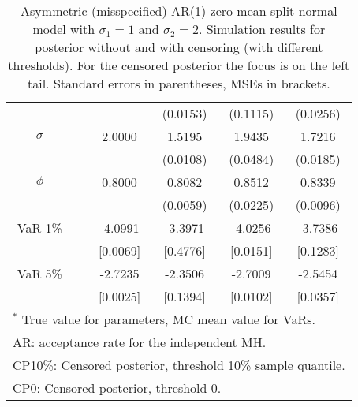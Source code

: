 {\begin{table}
\begin{tabular}{cc cccc}
&&   & (0.0153) & (0.1115) & (0.0256)  \\ 
$\sigma$&& 2.0000 & 1.5195 & 1.9435 & 1.7216  \\ 
&&   & (0.0108) & (0.0484) & (0.0185)  \\ 
$\phi$&& 0.8000 & 0.8082 & 0.8512 & 0.8339  \\ 
&&   & (0.0059) & (0.0225) & (0.0096)  \\ 
VaR 1\% && -4.0991 & -3.3971 & -4.0256 & -3.7386  \\ 
  && [0.0069] & [0.4776] & [0.0151] & [0.1283]  \\ 
VaR 5\% && -2.7235 & -2.3506 & -2.7009 & -2.5454  \\ 
 && [0.0025] & [0.1394] & [0.0102] & [0.0357]  \\ 
\hline 
\multicolumn{6}{l}{\footnotesize{$^*$ True value for parameters, MC mean value for VaRs.}}  \\ 
\multicolumn{6}{l}{\footnotesize{AR: acceptance rate for the independent MH.}}  \\ 
\multicolumn{6}{l}{\footnotesize{CP10\%: Censored posterior, threshold 10\% sample quantile.}}  \\ 
\multicolumn{6}{l}{\footnotesize{CP0: Censored posterior, threshold 0.}} 
\end{tabular}
 \caption{Asymmetric (misspecified) AR(1) zero mean split normal model with $\sigma_{1} = 1$ and $\sigma_{2} = 2$. Simulation results for posterior without and with censoring (with different thresholds). For the censored posterior the focus is on the left tail. Standard errors in parentheses, MSEs in brackets.} 
\label{tab:ar1_s2}  
\end{table}
}